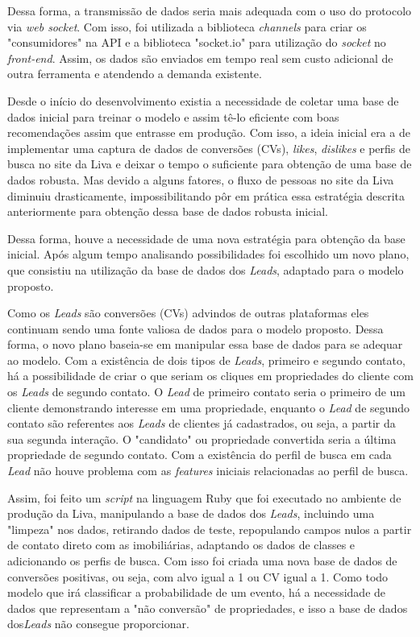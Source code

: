 Dessa forma, a transmissão de dados seria mais adequada com o uso do protocolo via \textit{web socket}. Com isso, foi utilizada a biblioteca \textit{channels} para criar os "consumidores" na API e a biblioteca "socket.io" para utilização do \textit{socket} no \textit{front-end}. Assim, os dados são enviados em tempo real sem custo adicional de outra ferramenta e atendendo a demanda existente.

Desde o início do desenvolvimento existia a necessidade de coletar uma base de dados inicial para treinar o modelo e assim tê-lo eficiente com boas recomendações assim que entrasse em produção. Com isso, a ideia inicial era a de implementar uma captura de dados de conversões (CVs), \textit{likes}, \textit{dislikes} e perfis de busca no site da Liva e deixar o tempo o suficiente para obtenção de uma base de dados robusta. Mas devido a alguns fatores, o fluxo de pessoas no site da Liva diminuiu drasticamente, impossibilitando pôr em prática essa estratégia descrita anteriormente para obtenção dessa base de dados robusta inicial.

Dessa forma, houve a necessidade de uma nova estratégia para obtenção da base inicial. Após algum tempo analisando possibilidades foi escolhido um novo plano, que consistiu na utilização da base de dados dos \textit{Leads}, adaptado para o modelo proposto.

Como os \textit{Leads} são conversões (CVs) advindos de outras plataformas eles continuam sendo uma fonte valiosa de dados para o modelo proposto. Dessa forma, o novo plano baseia-se em manipular essa base de dados para se adequar ao modelo. Com a existência de dois tipos de \textit{Leads}, primeiro e segundo contato, há a possibilidade de criar o que seriam os cliques em propriedades do cliente com os \textit{Leads} de segundo contato. O \textit{Lead} de primeiro contato seria o primeiro de um cliente demonstrando interesse em uma propriedade, enquanto o \textit{Lead} de segundo contato são referentes aos \textit{Leads} de clientes já cadastrados, ou seja, a partir da sua segunda interação. O "candidato" ou propriedade convertida seria a última propriedade de segundo contato. Com a  existência do perfil de busca em cada \textit{Lead} não houve problema com as \textit{features} iniciais relacionadas ao perfil de busca.

Assim, foi feito um \textit{script} na linguagem Ruby que foi executado no ambiente de produção da Liva, manipulando a base de dados dos \textit{Leads}, incluindo uma "limpeza" nos dados, retirando dados de teste, repopulando campos nulos a partir de contato direto com as imobiliárias, adaptando os dados de classes e adicionando os perfis de busca. Com isso foi criada uma nova base de dados de conversões positivas, ou seja, com alvo igual a 1 ou CV igual a 1. Como todo modelo que irá classificar a probabilidade de um evento, há a necessidade de dados que representam a "não conversão" de propriedades, e isso a base de dados dos\textit{Leads} não consegue proporcionar.

